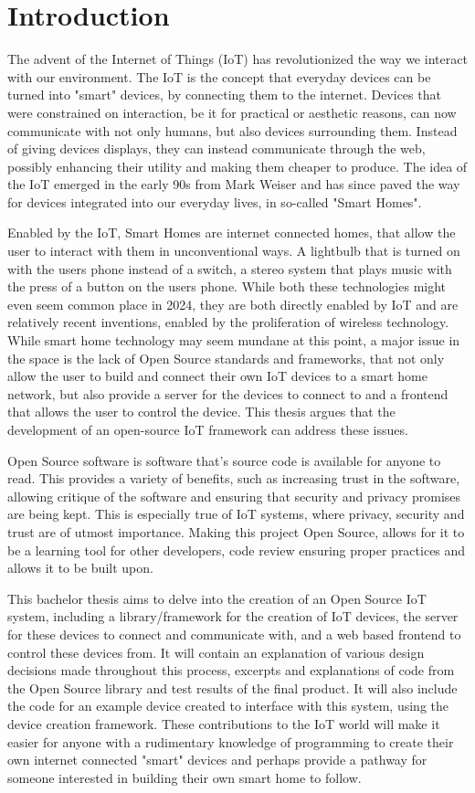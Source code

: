 \chapter{Introduction} \label{cha:intro}
The advent of the Internet of Things (IoT) has revolutionized the way we interact with our environment. The IoT is the concept that everyday devices can be turned into "smart" devices, by connecting them to the internet. Devices that were constrained on interaction, be it for practical or aesthetic reasons, can now communicate with not only humans, but also devices surrounding them. Instead of giving devices displays, they can instead communicate through the web, possibly enhancing their utility and making them cheaper to produce. The idea of the IoT emerged in the early 90s from Mark Weiser \cite{FromInternetToIot} and has since paved the way for devices integrated into our everyday lives, in so-called "Smart Homes".

Enabled by the IoT, Smart Homes are internet connected homes, that allow the user to interact with them in unconventional ways. A lightbulb that is turned on with the users phone instead of a switch, a stereo system that plays music with the press of a button on the users phone. While both these technologies might even seem common place in 2024, they are both directly enabled by IoT and are relatively recent inventions, enabled by the proliferation of wireless technology. While smart home technology may seem mundane at this point, a major issue in the space is the lack of Open Source standards and frameworks, that not only allow the user to build and connect their own IoT devices to a smart home network, but also provide a server for the devices to connect to and a frontend that allows the user to control the device. This thesis argues that the development of an open-source IoT framework can address these issues.

Open Source software is software that's source code is available for anyone to read. This provides a variety of benefits, such as increasing trust in the software, allowing critique of the software and ensuring that security and privacy promises are being kept. This is especially true of IoT systems, where privacy, security and trust are of utmost importance. Making this project Open Source, allows for it to be a learning tool for other developers, code review ensuring proper practices and allows it to be built upon.

This bachelor thesis aims to delve into the creation of an Open Source IoT system, including a library/framework for the creation of IoT devices, the server for these devices to connect and communicate with, and a web based frontend to control these devices from. It will contain an explanation of various design decisions made throughout this process, excerpts and explanations of code from the Open Source library and test results of the final product. It will also include the code for an example device created to interface with this system, using the device creation framework. These contributions to the IoT world will make it easier for anyone with a rudimentary knowledge of programming to create their own internet connected "smart" devices and perhaps provide a pathway for someone interested in building their own smart home to follow.    


